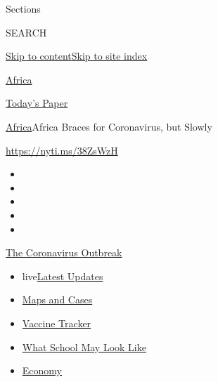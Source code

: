 Sections

SEARCH

\protect\hyperlink{site-content}{Skip to
content}\protect\hyperlink{site-index}{Skip to site index}

\href{https://www.nytimes.com/section/world/africa}{Africa}

\href{https://myaccount.nytimes.com/auth/login?response_type=cookie\&client_id=vi}{}

\href{https://www.nytimes.com/section/todayspaper}{Today's Paper}

\href{/section/world/africa}{Africa}\textbar{}Africa Braces for
Coronavirus, but Slowly

\url{https://nyti.ms/38ZsWzH}

\begin{itemize}
\item
\item
\item
\item
\item
\end{itemize}

\href{https://www.nytimes.com/news-event/coronavirus?action=click\&pgtype=Article\&state=default\&region=TOP_BANNER\&context=storylines_menu}{The
Coronavirus Outbreak}

\begin{itemize}
\tightlist
\item
  live\href{https://www.nytimes.com/2020/08/01/world/coronavirus-covid-19.html?action=click\&pgtype=Article\&state=default\&region=TOP_BANNER\&context=storylines_menu}{Latest
  Updates}
\item
  \href{https://www.nytimes.com/interactive/2020/us/coronavirus-us-cases.html?action=click\&pgtype=Article\&state=default\&region=TOP_BANNER\&context=storylines_menu}{Maps
  and Cases}
\item
  \href{https://www.nytimes.com/interactive/2020/science/coronavirus-vaccine-tracker.html?action=click\&pgtype=Article\&state=default\&region=TOP_BANNER\&context=storylines_menu}{Vaccine
  Tracker}
\item
  \href{https://www.nytimes.com/interactive/2020/07/29/us/schools-reopening-coronavirus.html?action=click\&pgtype=Article\&state=default\&region=TOP_BANNER\&context=storylines_menu}{What
  School May Look Like}
\item
  \href{https://www.nytimes.com/live/2020/07/31/business/stock-market-today-coronavirus?action=click\&pgtype=Article\&state=default\&region=TOP_BANNER\&context=storylines_menu}{Economy}
\end{itemize}

